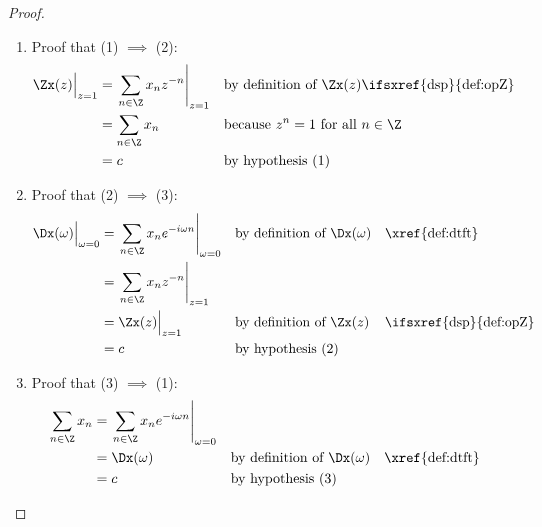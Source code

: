 \begin{proof}
\begin{enumerate}
  \item Proof that (1) $\implies$ (2):
    \begin{align*}
      \Zx(z)\Big|_{z=1}
        &= \left.\sum_{n\in\Z} x_n z^{-n} \right|_{z=1}
        && \text{by definition of $\Zx(z)$\ifsxref{dsp}{def:opZ}}
      \\&= \sum_{n\in\Z} x_n
        && \text{because $z^n=1$ for all $n\in\Z$}
      \\&= c
        && \text{by hypothesis (1)}
    \end{align*}


  \item Proof that (2) $\implies$ (3):
    \begin{align*}
      \Dx(\omega)\Big|_{\omega=0}
        &= \left.\sum_{n\in\Z} x_n e^{-i\omega n} \right|_{\omega=0}
        && \text{by definition of $\Dx(\omega)$}
        && \text{\xref{def:dtft}}
      \\&= \left.\sum_{n\in\Z} x_n z^{-n} \right|_{z=1}
      \\&= \Zx(z)\Big|_{z=1}
        && \text{by definition of $\Zx(z)$}
        && \text{\ifsxref{dsp}{def:opZ}}
      \\&= c
        && \text{by hypothesis (2)}
    \end{align*}

  \item Proof that (3) $\implies$ (1):
    \begin{align*}
      \sum_{n\in\Z} x_n
        &= \left.\sum_{n\in\Z} x_n e^{-i\omega n} \right|_{\omega=0}
      \\&= \Dx(\omega)
        && \text{by definition of $\Dx(\omega)$}
        && \text{\xref{def:dtft}}
      \\&= c
        && \text{by hypothesis (3)}
    \end{align*}
\end{enumerate}
\end{proof}

